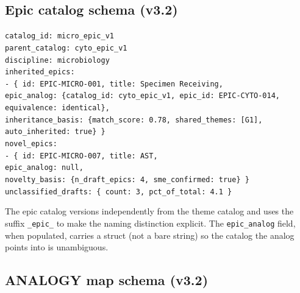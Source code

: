 \documentclass[10pt,letterpaper]{article}
\begin{document}
\subsection{Epic catalog schema (v3.2)}

\noindent\texttt{\scriptsize catalog\_id: micro\_epic\_v1\\
parent\_catalog: cyto\_epic\_v1\\
discipline: microbiology\\
inherited\_epics:\\
\hspace*{1em}- \{ id: EPIC-MICRO-001, title: Specimen Receiving,\\
\hspace*{2em}epic\_analog: \{catalog\_id: cyto\_epic\_v1, epic\_id: EPIC-CYTO-014, equivalence: identical\},\\
\hspace*{2em}inheritance\_basis: \{match\_score: 0.78, shared\_themes: [G1], auto\_inherited: true\} \}\\
novel\_epics:\\
\hspace*{1em}- \{ id: EPIC-MICRO-007, title: AST,\\
\hspace*{2em}epic\_analog: null,\\
\hspace*{2em}novelty\_basis: \{n\_draft\_epics: 4, sme\_confirmed: true\} \}\\
unclassified\_drafts: \{ count: 3, pct\_of\_total: 4.1 \}}

The epic catalog versions independently from the theme catalog and uses the suffix \texttt{\_epic\_} to make the naming distinction explicit. The \texttt{epic\_analog} field, when populated, carries a struct (not a bare string) so the catalog the analog points into is unambiguous.

\subsection{ANALOGY map schema (v3.2)}
\end{document}
